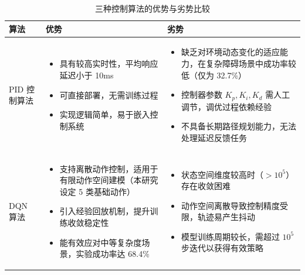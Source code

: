 \begin{table}[H]
\centering
\caption{三种控制算法的优势与劣势比较}
\label{tab:algo_analysis}
\renewcommand{\arraystretch}{1.4}
\begin{tabular}{
  >{\centering\arraybackslash}p{2.8cm}
  >{\centering\arraybackslash}p{6.2cm}
  >{\centering\arraybackslash}p{6.2cm}
}
\toprule
\textbf{算法} & \textbf{优势} & \textbf{劣势} \\
\midrule

PID 控制算法 &
\begin{itemize}[leftmargin=4mm,noitemsep]
  \item 具有较高实时性，平均响应延迟小于 10ms
  \item 可直接部署，无需训练过程
  \item 实现逻辑简单，易于嵌入控制系统
\end{itemize} &
\begin{itemize}[leftmargin=4mm,noitemsep]
  \item 缺乏对环境动态变化的适应能力，在复杂障碍场景中成功率较低（仅为 32.7\%）
  \item 控制器参数 $K_p, K_i, K_d$ 需人工调节，调优过程依赖经验
  \item 不具备长期路径规划能力，无法处理延迟反馈任务
\end{itemize} \\
\midrule

DQN 算法 &
\begin{itemize}[leftmargin=4mm,noitemsep]
  \item 支持离散动作控制，适用于有限动作空间建模（本研究设定 5 类基础动作）
  \item 引入经验回放机制，提升训练收敛稳定性
  \item 能有效应对中等复杂度场景，实验成功率达 68.4\%
\end{itemize} &
\begin{itemize}[leftmargin=4mm,noitemsep]
  \item 状态空间维度较高时（$>10^5$）存在收敛困难
  \item 动作空间离散导致控制精度受限，轨迹易产生抖动
  \item 模型训练周期较长，需超过 $10^5$ 步迭代以获得有效策略
\end{itemize} \\
\midrule


\end{tabular}
\end{table}
